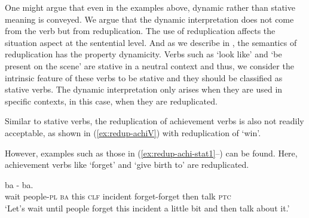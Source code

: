One might argue that even in the examples above, dynamic rather than stative meaning is conveyed.
We argue that the dynamic interpretation does not come from the verb but from reduplication.
The use of reduplication affects the situation aspect at the sentential level.
And as we describe in , the semantics of reduplication has the property dynamicity.
Verbs such as  `look like' and  `be present on the scene' are stative in a neutral context and thus, we consider the intrinsic feature of these verbs to be stative
and they should be classified as stative verbs.
The dynamic interpretation only arises when they are used in specific contexts, in this case, when they are reduplicated.

Similar to stative verbs, the reduplication of achievement verbs is also not readily acceptable,
as shown in (\ref{ex:redup-achiV}) with reduplication of  `win'.

\label{ex:redup-achiV}
\z

However, examples such as those in (\ref{ex:redup-achi-stat1}--) can be found.
Here, achievement verbs like  `forget' and  `give birth to' are reduplicated.

\settowidth{}


\ea
\ea\label{ex:redup-achi-stat1}
\gll {}  ba    -   ba.\footnotemark\\
wait people-\textsc{pl} \textsc{ba} this \textsc{clf} incident forget-forget then talk \textsc{ptc}\\
\glt `Let's wait until people forget this incident a little bit and then talk about it.'\\

